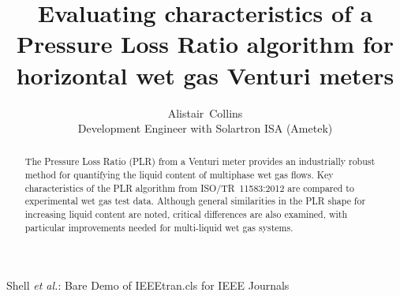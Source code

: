 \documentclass[journal]{IEEEtran}
\begin{document}
%
\title{Evaluating characteristics of a Pressure Loss Ratio algorithm for horizontal wet gas Venturi meters
}
%
%
%

\author{Alistair~Collins\\
Development Engineer with Solartron ISA (Ametek)
}


%
{Shell \MakeLowercase{\textit{et al.}}: Bare Demo of IEEEtran.cls for IEEE Journals}
% 











\maketitle

\begin{abstract}
The Pressure Loss Ratio (PLR) from a Venturi meter provides an industrially robust method for quantifying the liquid content of multiphase wet gas flows. Key characteristics of the PLR algorithm from ISO/TR~11583:2012 are compared to experimental wet gas test data. Although general similarities in the PLR shape for increasing liquid content are noted, critical differences are also examined, with particular improvements needed for multi-liquid wet gas systems.
\end{abstract}
\end{document}
